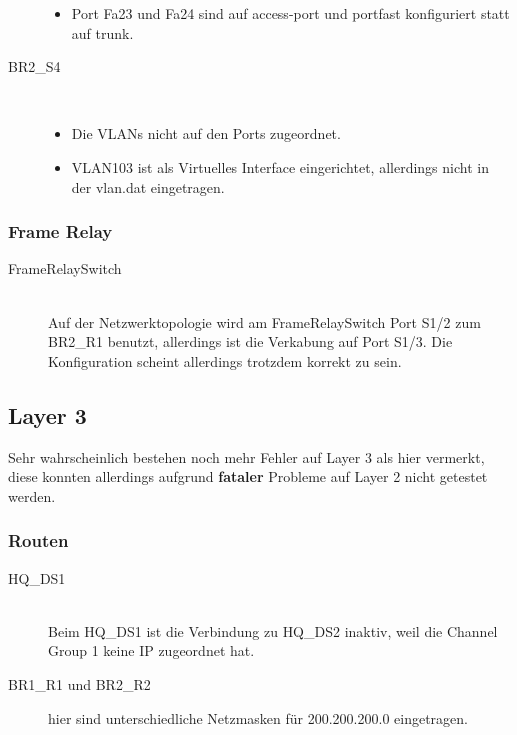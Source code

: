 \begin{description}
\begin{itemize}
		  \item Port Fa23 und Fa24 sind auf access-port und portfast konfiguriert statt auf trunk.
		\end{itemize}
	\item[BR2\_S4] \hfill \\
	  \begin{itemize}
	  	\item Die VLANs nicht auf den Ports zugeordnet.
		  \item VLAN103 ist als Virtuelles Interface eingerichtet, allerdings nicht in der vlan.dat eingetragen.
		\end{itemize}
\end{description}

\subsubsection{Frame Relay}

\begin{description}
	\item[FrameRelaySwitch] \hfill \\
	 Auf der Netzwerktopologie wird am FrameRelaySwitch Port S1/2 zum BR2\_R1 benutzt, allerdings ist die Verkabung auf Port S1/3. Die Konfiguration scheint allerdings trotzdem korrekt zu sein.
\end{description}

\subsection{Layer 3}

Sehr wahrscheinlich bestehen noch mehr Fehler auf Layer 3 als hier vermerkt, diese konnten allerdings aufgrund \textbf{fataler} Probleme auf Layer 2 nicht getestet werden.

\subsubsection{Routen}

\begin{description}
	\item[HQ\_DS1] \hfill \\
	 Beim HQ\_DS1 ist die Verbindung zu HQ\_DS2 inaktiv, weil die Channel Group 1 keine IP zugeordnet hat.
	 \item[BR1\_R1 und BR2\_R2] hier sind unterschiedliche Netzmasken für 200.200.200.0 eingetragen.
\end{description}

